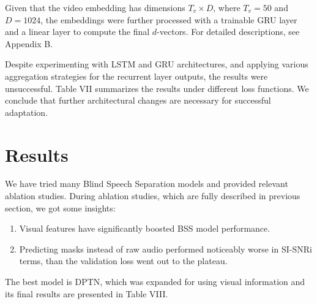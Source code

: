 \documentclass[10pt,conference,compsocconf]{IEEEtran}
\begin{document}
Given that the video embedding has dimensions $T_v \times D$, where $T_v = 50$ and $D = 1024$, the embeddings were further processed with a trainable GRU layer and a linear layer to compute the final $d$-vectors. For detailed descriptions, see Appendix B.

Despite experimenting with LSTM and GRU architectures, and applying various aggregation strategies for the recurrent layer outputs, the results were unsuccessful. Table VII summarizes the results under different loss functions. We conclude that further architectural changes are necessary for successful adaptation.

\begin{table}[h!]
\centering
\caption{VoiceFilter training results under different loss functions.}
\end{table}

\section{Results}\label{sec:results}
We have tried many Blind Speech Separation models and provided relevant ablation studies. During ablation studies, which are fully described in previous section, we got some insights:
\begin{enumerate}
    \item Visual features have significantly boosted BSS model performance.
    \item Predicting masks instead of raw audio performed noticeably worse in SI-SNRi terms, than the validation loss went out to the plateau.
\end{enumerate}
The best model is DPTN, which was expanded for using visual information and its final results are presented in Table VIII.
\begin{table}[H]
\centering
\caption{Final best model AV-DPTN results on validation split}
\end{table}
\end{document}
